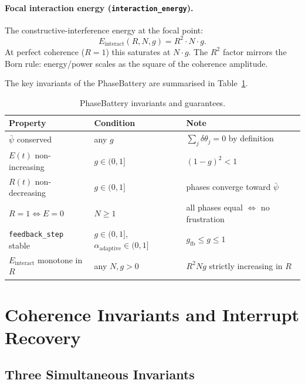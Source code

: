 \documentclass[12pt,a4paper]{article}
\theoremstyle{plain}
\theoremstyle{definition}
\theoremstyle{remark}
\begin{document}
\paragraph{Focal interaction energy (\texttt{interaction\_energy}).}
The constructive-interference energy at the focal point:
\begin{equation}
  E_{\mathrm{interact}}(R,N,g) = R^2 \cdot N \cdot g.
  \label{eq:focal-energy}
\end{equation}
At perfect coherence ($R=1$) this saturates at $N\cdot g$.  The $R^2$ factor
mirrors the Born rule: energy/power scales as the square of the coherence
amplitude.

\noindent
The key invariants of the PhaseBattery are summarised in
Table~\ref{tab:battery-invariants}.

\begin{table}[h]
\centering
\renewcommand{\arraystretch}{1.2}
\begin{tabular}{@{}lll@{}}
\toprule
Property & Condition & Note\\
\midrule
$\bar\psi$ conserved & any $g$
  & $\sum_j\delta\theta_j = 0$ by definition\\
$E(t)$ non-increasing & $g \in (0,1]$
  & $(1-g)^2 < 1$\\
$R(t)$ non-decreasing & $g \in (0,1]$
  & phases converge toward $\bar\psi$\\
$R=1 \Leftrightarrow E=0$ & $N \ge 1$
  & all phases equal $\Leftrightarrow$ no frustration\\
\texttt{feedback\_step} stable
  & $g\in(0,1]$, $\alpha_{\mathrm{adaptive}}\in(0,1]$
  & $g_{\mathrm{fb}}\le g\le 1$\\
$E_{\mathrm{interact}}$ monotone in $R$
  & any $N,g > 0$
  & $R^2 N g$ strictly increasing in $R$\\
\bottomrule
\end{tabular}
\caption{PhaseBattery invariants and guarantees.}
\label{tab:battery-invariants}
\end{table}

\section{Coherence Invariants and Interrupt Recovery}
\label{sec:invariants}

\subsection{Three Simultaneous Invariants}
\end{document}
